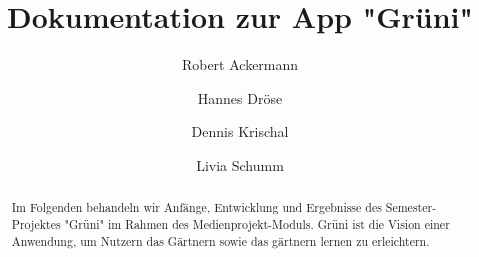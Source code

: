 \documentclass[sigchi, screen, nonacm]{acmart}
\begin{document}
\sloppy %

\title{Dokumentation zur App "Grüni"}


\author{Robert Ackermann}

\author{Hannes Dröse}

\author{Dennis Krischal}

\author{Livia Schumm}


\begin{abstract}
Im Folgenden behandeln wir Anfänge, Entwicklung und Ergebnisse des Semester-Projektes "Grüni" im Rahmen des Medienprojekt-Moduls. Grüni ist die Vision einer Anwendung, um Nutzern das Gärtnern sowie das gärtnern lernen zu erleichtern.
\end{abstract}


\maketitle



\appendix
\end{document}
